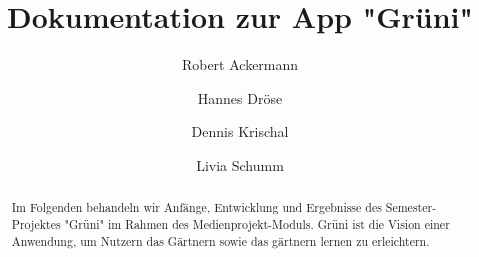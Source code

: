 \documentclass[sigchi, screen, nonacm]{acmart}
\begin{document}
\sloppy %

\title{Dokumentation zur App "Grüni"}


\author{Robert Ackermann}

\author{Hannes Dröse}

\author{Dennis Krischal}

\author{Livia Schumm}


\begin{abstract}
Im Folgenden behandeln wir Anfänge, Entwicklung und Ergebnisse des Semester-Projektes "Grüni" im Rahmen des Medienprojekt-Moduls. Grüni ist die Vision einer Anwendung, um Nutzern das Gärtnern sowie das gärtnern lernen zu erleichtern.
\end{abstract}


\maketitle



\appendix
\end{document}
